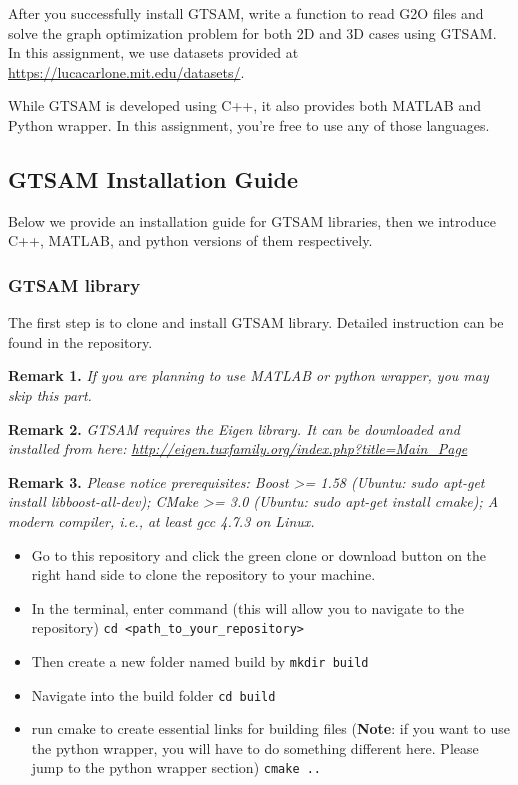 \documentclass{article}
\begin{document}
After you successfully install GTSAM, write a function to read G2O files and solve the graph optimization problem for both 2D and 3D cases using GTSAM. In this assignment, we use datasets provided at \url{https://lucacarlone.mit.edu/datasets/}.

While GTSAM is developed using C++, it also provides both MATLAB and Python wrapper. In this assignment, you’re free to use any of those languages.

\subsection{GTSAM Installation Guide}
Below we provide an installation guide for GTSAM libraries, then we introduce C++, MATLAB, and python versions of them respectively.

\subsubsection{GTSAM library}
The first step is to clone and install GTSAM library. Detailed instruction can be found in the repository.

\textbf{Remark 1.} \textit{If you are planning to use MATLAB or python wrapper, you may skip this part.}

\textbf{Remark 2.} \textit{GTSAM requires the Eigen library. It can be downloaded and installed from here: \url{http://eigen.tuxfamily.org/index.php?title=Main_Page}}

\textbf{Remark 3.} \textit{Please notice prerequisites: Boost >= 1.58 (Ubuntu: sudo apt-get install libboost-all-dev); CMake >= 3.0 (Ubuntu: sudo apt-get install cmake); A modern compiler, i.e., at least gcc 4.7.3 on Linux.}

\begin{itemize}
    \item Go to this repository and click the green clone or download button on the right hand side to clone the repository to your machine.
    \item In the terminal, enter command (this will allow you to navigate to the repository) \texttt{cd <path\_to\_your\_repository>}
    \item Then create a new folder named build by \texttt{mkdir build}
    \item Navigate into the build folder \texttt{cd build}
    \item run cmake to create essential links for building files (\textbf{Note}: if you want to use the python wrapper, you will have to do something different here. Please jump to the python wrapper section) \texttt{cmake ..}
\end{itemize}
\end{document}
